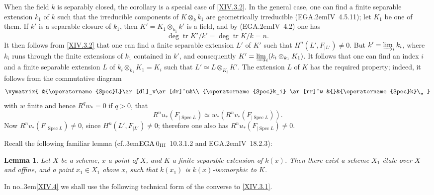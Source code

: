 \documentclass[11pt,a4paper,oneside]{book}
\providecommand{\sisi}[2]{#2}
\providecommand{\pageoriginale}{%
  \refstepcounter{pageoriginal}%
  \marginpar{\raggedright\footnotesize\bfseries\thepageoriginal}%
  \xspace}
\providecommand{\cf}{cf.\kern.3em}
\providecommand{\EGA}{\textup{EGA}\kern.2em}
\providecommand{\numero}{no.\kern.3em}
\DeclareMathOperator{\tr}{tr}
\providecommand{\Spec}{\operatorname{Spec}}
\theoremstyle{plain}
\newtheorem{lemme}[subsection]{Lemma}
\theoremstyle{definition}
\theoremstyle{remark}
\renewcommand{\Ref}[1]{\textup{\ref{#1}}}
\begin{document}
When the field $k$ is separab\sisi{le}{ly} closed, the corollary is a special case of \Ref{XIV.3.2}. In the general case, one can find a finite separable extension $k_1$ of $k\sisi{'}{}$ such that the irreducible components of $K \otimes_k k_1$ are geometrically irreducible (\EGA IV~4.5.11); let $K_1$ be one of them. If $k'$ is a separable closure of $k_1$, then $K' = K_1 \otimes_{k_1} k'$ is a field, and by (\EGA IV~4.2) one has
$$
\deg \tr K'/k' = \deg \tr K/k = n.
$$
It then follows from \Ref{XIV.3.2} that one can find a finite separable extension $L'$ of $K'$ such that $H^n(L', \sisi{F{|L'}}{F_{|L'}}) \neq 0$. But $k' = \varinjlim_i k_i$, where $k_i$ runs through the finite extensions of $k_1$ contained in $k'$, and consequently\pageoriginale $K' = \varinjlim_i (k_i \otimes_{k_1} K_1)$. It follows that one can find an index $i$ and a finite separable extension $L$ of $k_i \otimes_{k_1} K_1 =K_i$ such that $L' \simeq L \otimes_{K_i} K'$. The extension $L$ of $K$ has the required property; indeed, it follows from the commutative diagram
$$
\xymatrix{
&{\Spec L}\ar[dl]_v\ar[dr]^u&\\
{\Spec k_i} \ar[rr]^w &{}&{\Spec k}\,,
}
$$
with $w$ finite and hence $R^q w_* = 0$ if $q>0$, that
$$R^n u_*(\sisi{F{|\Spec L}}{F_{|\Spec L}}) \simeq w_*(R^n v_*(\sisi{F{|\Spec L}}{F_{|\Spec L}})).
$$
Now $R^nv_*(\sisi{F{|\Spec L}}{F_{|\Spec L}}) \neq 0$, since $H^n(L', \sisi{F{|L'}}{F_{|L'}}) \neq 0$; therefore one also has $R^nu_*(\sisi{F{|\Spec L}}{F_{|\Spec L}}) \neq 0$.

Recall the following familiar lemma (\cf $\EGA 0_{\textup{III}}$~10.3.1.2 and \EGA IV~18.2.3):

\begin{lemme} \label{XIV.3.4}
Let $X$ be a scheme, $x$ a point of $X$, and $K$ a finite separable extension of $k(x)$. Then there exist a scheme $X_1$ étale over $X$ and affine, and a point $x_1 \in X_1$ above $x$, such that $k(x_1)$ is $k(x)$-isomorphic to $K$.
\end{lemme}

In \numero \Ref{XIV.4} we shall use the following technical form of the converse to \Ref{XIV.3.1}.
\end{document}
